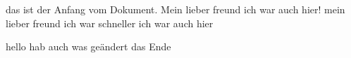 das ist der Anfang vom Dokument.
Mein lieber freund ich war auch hier!
mein lieber freund ich war schneller ich war auch hier





hello hab auch was geändert
das Ende